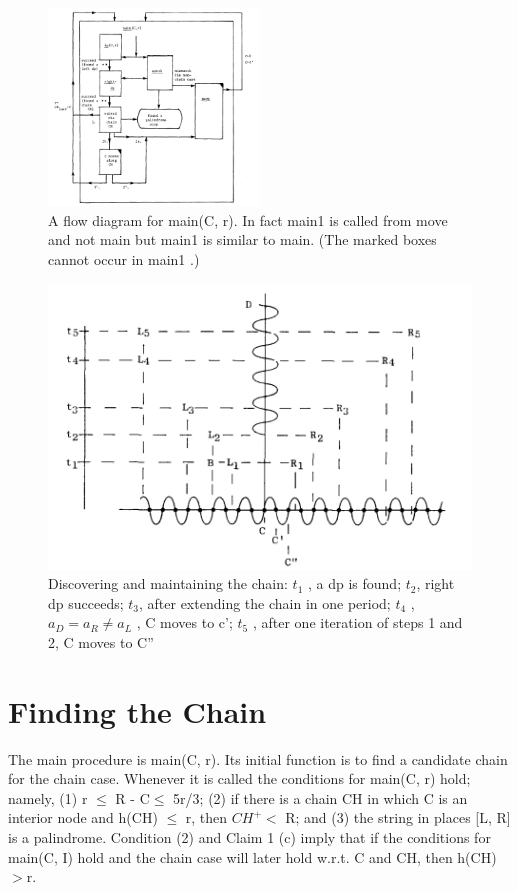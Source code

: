 \documentclass[11pt,a4paper]{report}
\begin{document}
\begin{figure}[h]
    \centerline{\includegraphics[width=0.5\textwidth]{./images/2.png}}
    \caption{A flow diagram for main(C, r). In fact main1 is called from move and not main but main1
    is similar to main. (The marked boxes cannot occur in main1 .) }
    \label{fig}
\end{figure}
\begin{figure}[h]
    \centerline{\includegraphics{./images/3.png}}
    \caption{Discovering and maintaining the chain: $t_1$ , a dp is found; $t_2$, right dp succeeds;
    $t_3 $, after extending the chain in one period; $t_4$ , $a_D = a_R \neq a_L$ , C moves to c’; $t_5$ , after one iteration
    of steps 1 and 2, C moves to C”}
    \label{fig}
\end{figure}

\chapter{Finding the Chain}

The main procedure is main(C, r). Its initial function is to find a candidate chain for
the chain case. Whenever it is called the conditions for main(C, r) hold; namely, (1) r $\leq$
R - C$\leq$ 5r/3; (2) if there is a chain CH in which C is an interior node and h(CH) $\leq$ r,
then $CH^+ <$ R; and (3) the string in places [L, R] is a palindrome. Condition (2) and
Claim 1 (c) imply that if the conditions for main(C, I) hold and the chain case will later
hold w.r.t. C and CH, then h(CH)$>$r.
\end{document}
